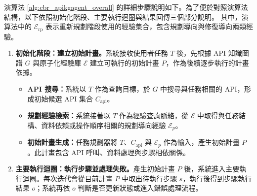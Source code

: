 \begin{ZhChapter}
演算法 \ref{alg:cbr_apikgagent_overall} 的詳細步驟說明如下。為了便於對照演算法結構，以下依照初始化階段、主要執行迴圈與結果回傳三個部分說明。
其中，演算法中的 \(\mathcal{E}_{\mathrm{rp}}\) 表示重新規劃階段使用的經驗集合，包含規劃導向與修復導向兩類經驗。

\begin{enumerate}
    \item \textbf{初始化階段：建立初始計畫。}系統接收使用者任務 \(T\) 後，先根據 API 知識圖譜 \(G\) 與原子化經驗庫 \(\mathcal{E}\) 建立可執行的初始計畫 \(P\)，作為後續逐步執行的計畫依據。

    \begin{itemize}
        \item \textbf{API 搜尋：}系統以 \(T\) 作為查詢目標，於 \(G\) 中搜尋與任務相關的 API，形成初始候選 API 集合 \(C_{\mathrm{api}}\)。
        \item \textbf{規劃經驗檢索：}系統接著以 \(T\) 作為經驗查詢脈絡，從 \(\mathcal{E}\) 中取得與任務結構、資料依賴或操作順序相關的規劃導向經驗 \(\mathcal{E}_p\)。
        \item \textbf{初始計畫生成：}任務規劃器將 \(T\)、\(C_{\mathrm{api}}\) 與 \(\mathcal{E}_p\) 作為輸入，產生初始計畫 \(P\)。此計畫包含 API 呼叫、資料處理與步驟相依關係。
    \end{itemize}

    \item \textbf{主要執行迴圈：執行步驟並處理失敗。}產生初始計畫 \(P\) 後，系統進入主要執行迴圈。每次迭代會從目前計畫 \(P\) 中取出待執行步驟 \(s\)，執行後得到步驟執行結果 \(o\)；系統再依 \(o\) 判斷是否更新狀態或進入錯誤處理流程。


\end{enumerate}
\end{ZhChapter}
